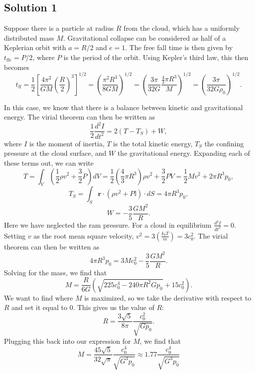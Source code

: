 \documentclass[11pt]{article}
\newenvironment{tight_enumerate}{
\begin{enumerate}[label=(\alph*)]
\setlength{\itemsep}{3pt}
\setlength{\parskip}{0pt}
}{\end{enumerate}}
\begin{document}
\subsection*{Solution 1}
\begin{tight_enumerate}
\item Suppose there is a particle at radius $R$ from the cloud, which has a uniformly distributed mass $M$. Gravitational collapse can be considered as half of a Keplerian orbit with $a = R/2$ and $e = 1$. The free fall time is then given by $t_{\text{ffc}} = P/2$, where $P$ is the period of the orbit. Using Kepler's third law, this then becomes 
\[t_{\text{ff}} = \frac{1}{2}\left[\frac{4\pi^{2}}{GM}\left(\frac{R}{2}\right)^{3}\right]^{1/2} = \left(\frac{\pi^{2}R^{3}}{8GM}\right)^{1/2} = \left(\frac{3\pi}{32G}\frac{\frac{4}{3}{\pi}R^{3}}{M}\right)^{1/2} = \left(\frac{3\pi}{32G\rho_{0}}\right)^{1/2}.\]
\newpage
\item In this case, we know that there is a balance between kinetic and gravitational energy. The virial theorem can then be written as 
\[\frac{1}{2}\frac{d^{2}I}{dt^{2}} = 2(T-T_{S}) + W,\]
where $I$ is the moment of inertia, $T$ is the total kinetic energy, $T_{S}$ the confining pressure at the cloud surface, and $W$ the gravitational energy. Expanding each of these terms out, we can write
\[T = \int_{V}{\left(\frac{1}{2}{\rho}v^{2}+\frac{3}{2}P\right)dV} = \frac{1}{2}\left(\frac{4}{3}{\pi}R^{3}\right){\rho}v^{2} + \frac{3}{2}PV = \frac{1}{2}Mv^{2} + 2{\pi}R^{3}p_{0},\]
\[T_{S} = \int_{S}{\mathbf{r} \cdot ({\rho}v^{2} + P\mathbb{I}) \cdot dS} = 4{\pi}R^{3}p_{0},\]
\[W = -\frac{3}{5}\frac{GM^{2}}{R}.\]
Here we have neglected the ram pressure. For a cloud in equilibrium $\frac{d^{2}I}{dt^{2}} = 0$. Setting $v$ as the root mean square velocity, $v^{2} = 3\left(\frac{k_{b}T}{m}\right) = 3c_{0}^{2}$. The virial theorem can then be written as 
\[4{\pi}R^{3}p_{0} = 3Mc_{0}^{2} - \frac{3}{5}\frac{GM^{2}}{R}.\]
Solving for the mass, we find that 
\[M = \frac{R}{6G}\left(\sqrt{225c_{0}^{4}-240{\pi}R^{2}Gp_{0}}+15c_{0}^{2}\right).\]
We want to find where $M$ is maximized, so we take the derivative with respect to $R$ and set it equal to 0. This gives us the value of $R$:
\[R = \frac{3\sqrt{5}}{8\pi}\frac{c_{0}^{2}}{\sqrt{Gp_{0}}}.\]
Plugging this back into our expression for $M$, we find that 
\[M = \frac{45\sqrt{5}}{32\sqrt{\pi}}\frac{c_{0}^{4}}{\sqrt{G^{3}p_{0}}} \approx 1.77\frac{c_{0}^{4}}{\sqrt{G^{3}p_{0}}}\]

\end{tight_enumerate}
\end{document}
